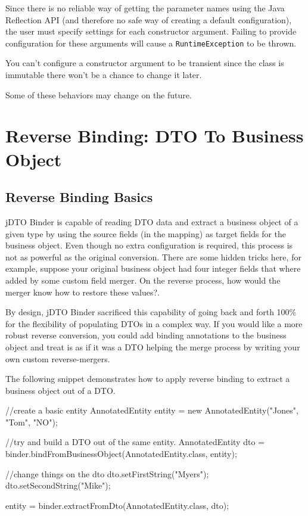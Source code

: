 \documentclass[11pt]{article}
\newcommand{\JDTO}{jDTO Binder\xspace}
\begin{document}
Since there is no reliable way of getting the parameter names using the Java Reflection API (and therefore no safe way of creating a default configuration), the user must specify settings for each constructor argument. Failing to provide configuration for these arguments will cause a \texttt{RuntimeException} to be thrown.

You can't configure a constructor argument to be transient since the class is immutable there won't be a chance to change it later.

Some of these behaviors may change on the future.

\clearpage

\section{Reverse Binding: DTO To Business Object}

\subsection{Reverse Binding Basics}

\JDTO is capable of reading DTO data and extract a business object of a given type by using the source fields (in the mapping) as target fields for the business object. Even though no extra configuration is required, this process is not as powerful as the original conversion. There are some hidden tricks here, for example, suppose your original business object had four integer fields that where added by some custom field merger. On the reverse process, how would the merger know how to restore these values?. 

By design, \JDTO sacrificed this capability of going back and forth 100\% for the flexibility of populating DTOs in a complex way. If you would like a more robust reverse conversion, you could add binding annotations to the business object and treat is as if it was a DTO helping the merge process by writing your own custom reverse-mergers.

The following snippet demonstrates how to apply reverse binding to extract a business object out of a DTO.

\begin{java}
//create a basic entity
AnnotatedEntity entity = new AnnotatedEntity("Jones", "Tom", "NO");
        
//try and build a DTO out of the same entity.
AnnotatedEntity dto = binder.bindFromBusinessObject(AnnotatedEntity.class, entity);
        
//change things on the dto
dto.setFirstString("Myers");
dto.setSecondString("Mike");
        
entity = binder.extractFromDto(AnnotatedEntity.class, dto);
        
\end{java}
\end{document}
